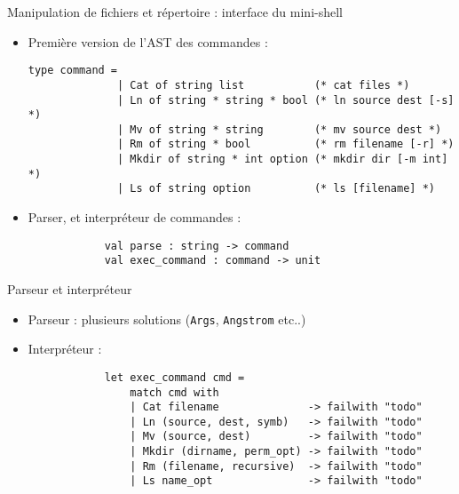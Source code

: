 \begin{frame}[fragile]{Manipulation de fichiers et répertoire : interface du mini-shell}
    \begin{itemize}[leftmargin=-12pt]
    \item<1->Première version de l'AST des commandes :
        \begin{lstlisting}[breaklines=false]
            type command =
              | Cat of string list           (* cat files *)  
              | Ln of string * string * bool (* ln source dest [-s] *)
              | Mv of string * string        (* mv source dest *)
              | Rm of string * bool          (* rm filename [-r] *)  
              | Mkdir of string * int option (* mkdir dir [-m int] *)
              | Ls of string option          (* ls [filename] *)  
        \end{lstlisting}
        
    \item<2-> Parser, et interpréteur de commandes :
         \begin{lstlisting}
            val parse : string -> command
            val exec_command : command -> unit 
        \end{lstlisting}
    \end{itemize}
\end{frame}  

\begin{frame}[fragile]{Parseur et interpréteur}

    \begin{itemize}[label=\small{}]
    \item Parseur : plusieurs solutions (\texttt{Args}, \texttt{Angstrom} etc..)
    \item Interpréteur : 
      \begin{lstlisting}
            let exec_command cmd = 
                match cmd with
                | Cat filename              -> failwith "todo"
                | Ln (source, dest, symb)   -> failwith "todo"
                | Mv (source, dest)         -> failwith "todo"
                | Mkdir (dirname, perm_opt) -> failwith "todo"
                | Rm (filename, recursive)  -> failwith "todo"
                | Ls name_opt               -> failwith "todo"
        \end{lstlisting}
    \end{itemize}
\end{frame} 

